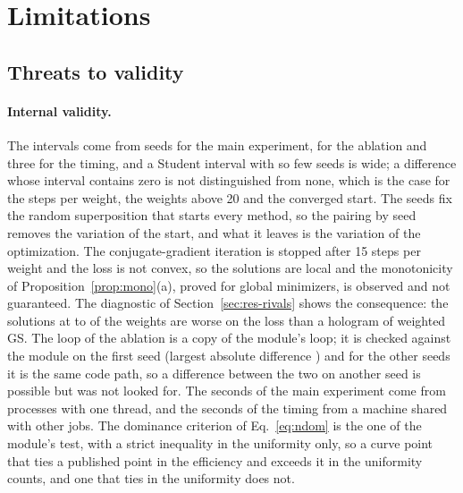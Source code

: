 \section{Limitations}\label{sec:limits}

\subsection{Threats to validity}\label{sec:threats}

\paragraph{Internal validity.} The intervals come from \nSeeds{} seeds for the main experiment, \nSeedsAbl{} for the ablation and three for the timing, and a Student interval with so few seeds is wide; a difference whose interval contains zero is not distinguished from none, which is the case for the steps per weight, the weights above 20 and the converged start. The seeds fix the random superposition that starts every method, so the pairing by seed removes the variation of the start,
and what it leaves is the variation of the optimization. The conjugate-gradient iteration is stopped after 15 steps per weight and the loss is not convex, so the solutions are local and the monotonicity of Proposition~\ref{prop:mono}(a), proved for global minimizers, is observed and not guaranteed. The diagnostic of Section~\ref{sec:res-rivals} shows the consequence: the solutions at \diagGswHundredMin{} to \diagGswHundredMax{} of the weights are worse on the loss than a hologram of weighted GS.
The loop of the ablation is a copy of the module's loop; it is checked against the module on the first seed (largest absolute difference \consistMax{}) and for the other seeds it is the same code path, so a difference between the two on another seed is possible but was not looked for. The seconds of the main experiment come from processes with one thread, and the seconds of the timing from a machine shared with other jobs.
The dominance criterion of Eq.~\ref{eq:ndom} is the one of the module's test, with a strict inequality in the uniformity only, so a curve point that ties a published point in the efficiency and exceeds it in the uniformity counts, and one that ties in the uniformity does not.

